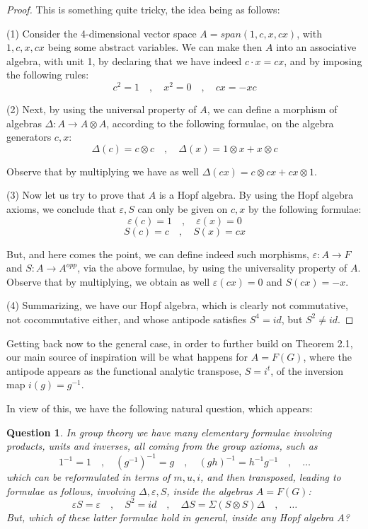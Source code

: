 \documentclass[12pt]{amsbook}
\newtheorem{question}[theorem]{Question}
\begin{document}
\begin{proof}
This is something quite tricky, the idea being as follows:

\medskip

(1) Consider the 4-dimensional vector space $A=span(1,c,x,cx)$, with $1,c,x,cx$ being some abstract variables. We can make then $A$ into an associative algebra, with unit 1, by declaring that we have indeed $c\cdot x=cx$, and by imposing the following rules:
$$c^2=1\quad,\quad x^2=0\quad,\quad cx=-xc$$

(2) Next, by using the universal property of $A$, we can define a morphism of algebras $\Delta:A\to A\otimes A$, according to the following formulae, on the algebra generators $c,x$:
$$\Delta(c)=c\otimes c\quad,\quad\Delta(x)=1\otimes x+x\otimes c$$
 
Observe that by multiplying we have as well $\Delta(cx)=c\otimes cx+cx\otimes1$.

\medskip

(3) Now let us try to prove that $A$ is a Hopf algebra. By using the Hopf algebra axioms, we conclude that $\varepsilon,S$ can only be given on $c,x$ by the following formulae: 
$$\varepsilon(c)=1\quad,\quad\varepsilon(x)=0$$
$$S(c)=c\quad,\quad S(x)=cx$$

But, and here comes the point, we can define indeed such morphisms, $\varepsilon:A\to F$ and $S:A\to A^{opp}$, via the above formulae, by using the universality property of $A$. Observe that by multiplying, we obtain as well $\varepsilon(cx)=0$ and $S(cx)=-x$.

\medskip

(4) Summarizing, we have our Hopf algebra, which is clearly not commutative, not cocommutative either, and whose antipode satisfies $S^4=id$, but $S^2\neq id$.
\end{proof}

Getting back now to the general case, in order to further build on Theorem 2.1, our main source of inspiration will be what happens for $A=F(G)$, where the antipode appears as the functional analytic transpose, $S=i^t$, of the inversion map $i(g)=g^{-1}$. 

\bigskip

In view of this, we have the following natural question, which appears:

\begin{question}
In group theory we have many elementary formulae involving products, units and inverses, all coming from the group axioms, such as 
$$1^{-1}=1\quad,\quad (g^{-1})^{-1}=g\quad,\quad (gh)^{-1}=h^{-1}g^{-1}\quad,\quad\ldots$$
which can be reformulated in terms of $m,u,i$, and then transposed, leading to formulae as follows, involving $\Delta,\varepsilon,S$, inside the algebras $A=F(G)$:
$$\varepsilon S=\varepsilon\quad,\quad S^2=id\quad,\quad \Delta S=\Sigma(S\otimes S)\Delta\quad,\quad\ldots$$
But, which of these latter formulae hold in general, inside any Hopf algebra $A$?
\end{question}
\end{document}
